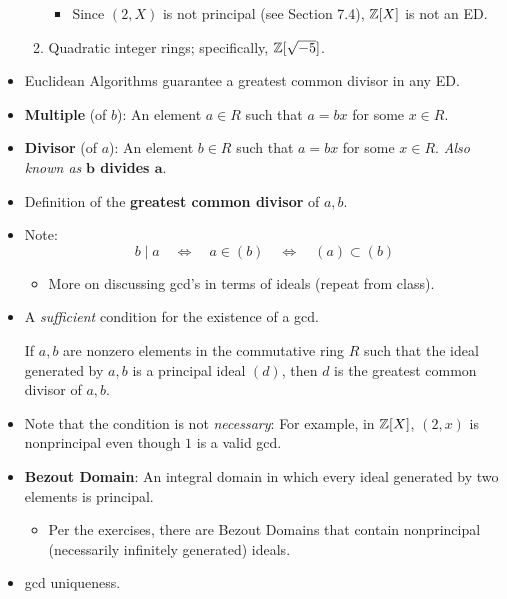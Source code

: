 \documentclass[../notes.tex]{subfiles}
\begin{document}
\begin{itemize}
\begin{enumerate}
\begin{itemize}
            \item Since $(2,X)$ is not principal (see Section 7.4), $\mathbb{Z}[X]$ is not an ED.
        \end{itemize}
        \item Quadratic integer rings; specifically, $\mathbb{Z}[\sqrt{-5}]$.
    \end{enumerate}
    \item Euclidean Algorithms guarantee a greatest common divisor in any ED.
    \item \textbf{Multiple} (of $b$): An element $a\in R$ such that $a=bx$ for some $x\in R$.
    \item \textbf{Divisor} (of $a$): An element $b\in R$ such that $a=bx$ for some $x\in R$. \emph{Also known as} \textbf{$\bm{b}$ divides $\bm{a}$}.
    \item Definition of the \textbf{greatest common divisor} of $a,b$.
    \item Note:
    \begin{equation*}
        b \mid a
        \quad\Longleftrightarrow\quad
        a \in (b)
        \quad\Longleftrightarrow\quad
        (a) \subset (b)
    \end{equation*}
    \begin{itemize}
        \item More on discussing gcd's in terms of ideals (repeat from class).
    \end{itemize}
    \item A \emph{sufficient} condition for the existence of a gcd.
    \begin{proposition}\label{prp:8.2}
        If $a,b$ are nonzero elements in the commutative ring $R$ such that the ideal generated by $a,b$ is a principal ideal $(d)$, then $d$ is the greatest common divisor of $a,b$.
    \end{proposition}
    \item Note that the condition is not \emph{necessary}: For example, in $\mathbb{Z}[X]$, $(2,x)$ is nonprincipal even though $1$ is a valid gcd.
    \item \textbf{Bezout Domain}: An integral domain in which every ideal generated by two elements is principal.
    \begin{itemize}
        \item Per the exercises, there are Bezout Domains that contain nonprincipal (necessarily infinitely generated) ideals.
    \end{itemize}
    \item gcd uniqueness.
    \begin{proposition}\label{prp:8.3}

\end{proposition}
\end{itemize}
\end{document}
